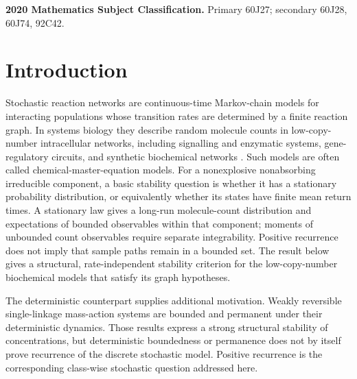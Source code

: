 \medskip
\noindent\textbf{2020 Mathematics Subject Classification.}
Primary 60J27; secondary 60J28, 60J74, 92C42.

\section{Introduction}\label{sec:intro}

Stochastic reaction networks are continuous-time Markov-chain models for
interacting populations whose transition rates are determined by a finite
reaction graph.  In systems biology they describe random molecule counts in
low-copy-number intracellular networks, including signalling and enzymatic
systems, gene-regulatory circuits, and synthetic biochemical networks
\citep{AndersonKurtz2015}.  Such models are often called chemical-master-equation
models.  For a nonexplosive nonabsorbing irreducible component, a basic
stability question
is whether it has a stationary probability distribution, or equivalently
whether its states have finite mean return times.  A stationary law gives a
long-run molecule-count distribution and expectations of bounded observables
within that component; moments of unbounded count observables require separate
integrability.  Positive recurrence does not imply that sample paths remain
in a bounded set.  The result below gives a structural, rate-independent
stability criterion for the low-copy-number biochemical models that satisfy
its graph hypotheses.

The deterministic counterpart supplies additional motivation.  Weakly
reversible single-linkage mass-action systems are bounded
\citep{Anderson2011Boundedness} and permanent \citep{BorosHofbauer2020} under
their deterministic dynamics.  Those results express a strong structural
stability of concentrations, but deterministic boundedness or permanence does
not by itself prove recurrence of the discrete stochastic model.  Positive
recurrence is the corresponding class-wise stochastic question addressed
here.

